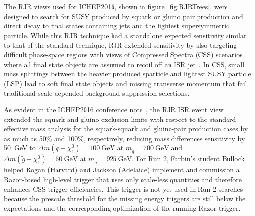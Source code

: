 The RJR views used for ICHEP2016, shown in figure~\ref{fig:RJRTrees},
were designed to search for SUSY produced by squark or gluino pair
production and direct decay to final states containing jets and the
lightest supersymmetric particle. While this RJR technique had a
standalone expected sensitivity similar to that of the standard
technique, RJR extended sensitivity by also targeting difficult
phase-space regions with views of Compressed Spectra (CSS) scenarios
where all final state objects are assumed to recoil off an ISR
jet~\cite{Jackson:2016mfb}. In CSS, small mass splittings between the
heavier produced sparticle and lightest SUSY particle (LSP) lead to
soft final state objects and missing transverse momentum that fail
traditional scale-depended background suppression selections.

As evident in the ICHEP2016 conference note~\cite{}, the RJR ISR event
view extended the squark and gluino exclusion limits with respect to
the standard effective mass analysis for the squark-squark and
gluino-pair production cases by as much as 50\% and 100\%,
respectively, reducing mass differences sensitivity by 50~GeV to
$\Delta m(\tilde{q} -
\chi_1^0) = 100~\mathrm{GeV}$ at $m_{\tilde{q}} = 700~\mathrm{GeV}$  and 
$\Delta m(\tilde{g} -\chi_1^0) = 50~\mathrm{GeV}$ at $m_{\tilde{g}} =
925~\mathrm{GeV}$. For Run 2, Farbin's student Bullock helped Rogan
(Harvard) and Jackson (Adelaide) implement and commission a
Razor-based high-level trigger that uses only scale-less quantities
and therefore enhances CSS trigger efficiencies. This trigger is not
yet used in Run 2 searches because the prescale threshold for the
missing energy triggers are still below the expectations and the
corresponding optimization of the running Razor trigger.

